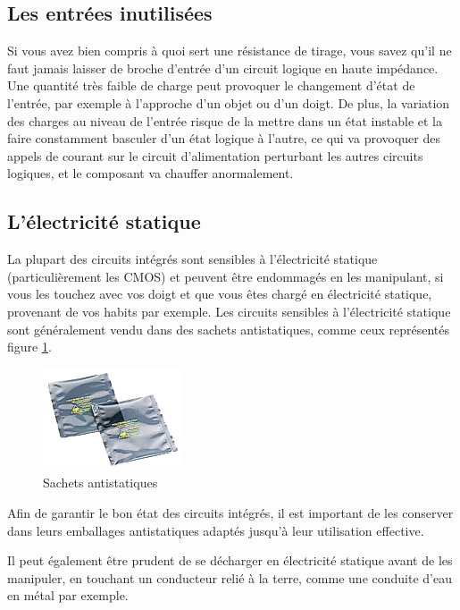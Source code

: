\documentclass[a4paper]{article}
\begin{document}
\subsection{Les entrées inutilisées}

Si vous avez bien compris à quoi sert une résistance de tirage, vous savez qu'il ne faut jamais laisser de broche d'entrée d'un circuit logique en haute impédance. Une quantité très faible de charge peut provoquer le changement d'état de l'entrée, par exemple à l'approche d'un objet ou d'un doigt. De plus, la variation des charges au niveau de l'entrée risque de la mettre dans un état instable et la faire constamment basculer d'un état logique à l'autre, ce qui va provoquer des appels de courant sur le circuit d'alimentation perturbant les autres circuits logiques, et le composant va chauffer anormalement.

\subsection{L'électricité statique}

La plupart des circuits intégrés sont sensibles à l'électricité statique (particulièrement les \ac{CMOS}) et peuvent être endommagés en les manipulant, si vous les touchez avec vos doigt et que vous êtes chargé en électricité statique, provenant de vos habits par exemple. Les circuits sensibles à l'électricité statique sont généralement vendu dans des sachets antistatiques, comme ceux représentés figure \ref{Sachets_antistatiques}.

\begin{figure}[H]
	\centering
	\includegraphics[scale=0.75]{Images/Sachets_antistatiques.png}
	\caption{Sachets antistatiques
		\label{Sachets_antistatiques}}
\end{figure}

Afin de garantir le bon état des circuits intégrés, il est important de les conserver dans leurs emballages antistatiques adaptés jusqu'à leur utilisation effective.

Il peut également être prudent de se décharger en électricité statique avant de les manipuler, en touchant un conducteur relié à la terre, comme une conduite d'eau en métal par exemple.
\end{document}
